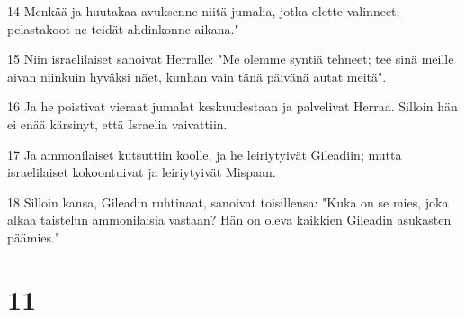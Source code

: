 \par 14 Menkää ja huutakaa avuksenne niitä jumalia, jotka olette valinneet; pelastakoot ne teidät ahdinkonne aikana."
\par 15 Niin israelilaiset sanoivat Herralle: "Me olemme syntiä tehneet; tee sinä meille aivan niinkuin hyväksi näet, kunhan vain tänä päivänä autat meitä".
\par 16 Ja he poistivat vieraat jumalat keskuudestaan ja palvelivat Herraa. Silloin hän ei enää kärsinyt, että Israelia vaivattiin.
\par 17 Ja ammonilaiset kutsuttiin koolle, ja he leiriytyivät Gileadiin; mutta israelilaiset kokoontuivat ja leiriytyivät Mispaan.
\par 18 Silloin kansa, Gileadin ruhtinaat, sanoivat toisillensa: "Kuka on se mies, joka alkaa taistelun ammonilaisia vastaan? Hän on oleva kaikkien Gileadin asukasten päämies."

\chapter{11}

